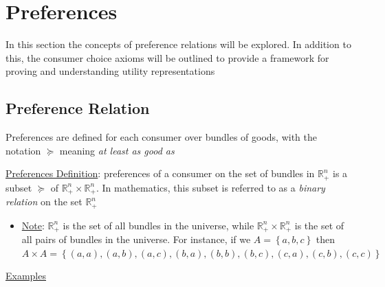 \documentclass{article}
\begin{document}
\newpage

\vspace{2.5mm}
\section{Preferences}
In this section the concepts of preference relations will be explored. In addition to this, the consumer choice axioms will be outlined to provide a framework for proving and understanding utility representations \par
\vspace{6mm}
\subsection{Preference Relation}
Preferences are defined for each consumer over bundles of goods, with the notation $\succeq$ meaning \textit{at least as good as} \par \vspace{0.3em}
  \underline{Preferences Definition}: preferences of a consumer on the set of bundles in $\mathbb{R}_{+}^{n}$ is a subset $\succeq$ of $\mathbb{R}_{+}^{n} \times \mathbb{R}_{+}^{n}$. In mathematics, this subset is referred to as a \textit{binary relation} on the set $\mathbb{R}_{+}^{n}$
  \begin{itemize}
    \item  \underline{Note}: $\mathbb{R}_{+}^{n}$ is the set of all bundles in the universe, while $\mathbb{R}_{+}^{n} \times \mathbb{R}_{+}^{n}$ is the set of all pairs of bundles in the universe. For instance, if we $A = \left\{a, b, c\right\}$ then  $A \times A = \left\{(a,a), (a,b), (a,c), (b,a), (b,b), (b,c), (c,a), (c,b), (c,c) \right\}$
  \end{itemize}
  \par
  \underline{Examples}
\end{document}
